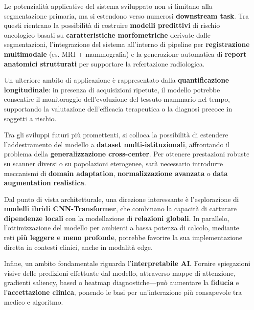 
Le potenzialità applicative del sistema sviluppato non si limitano alla segmentazione primaria, ma si estendono verso numerosi \textbf{downstream task}. Tra questi rientrano la possibilità di costruire \textbf{modelli predittivi} di rischio oncologico basati su \textbf{caratteristiche morfometriche} derivate dalle segmentazioni, l’integrazione del sistema all’interno di pipeline per \textbf{registrazione multimodale} (es. MRI + mammografia) e la generazione automatica di \textbf{report anatomici strutturati} per supportare la refertazione radiologica.

Un ulteriore ambito di applicazione è rappresentato dalla \textbf{quantificazione longitudinale}: in presenza di acquisizioni ripetute, il modello potrebbe consentire il monitoraggio dell’evoluzione del tessuto mammario nel tempo, supportando la valutazione dell’efficacia terapeutica o la diagnosi precoce in soggetti a rischio.


Tra gli sviluppi futuri più promettenti, si colloca la possibilità di estendere l’addestramento del modello a \textbf{dataset multi-istituzionali}, affrontando il problema della \textbf{generalizzazione cross-center}. Per ottenere prestazioni robuste su scanner diversi o su popolazioni eterogenee, sarà necessario introdurre meccanismi di \textbf{domain adaptation}, \textbf{normalizzazione avanzata} o \textbf{data augmentation realistica}.

Dal punto di vista architetturale, una direzione interessante è l’esplorazione di \textbf{modelli ibridi CNN-Transformer}, che combinano la capacità di catturare \textbf{dipendenze locali} con la modellazione di \textbf{relazioni globali}. In parallelo, l’ottimizzazione del modello per ambienti a bassa potenza di calcolo, mediante reti \textbf{più leggere e meno profonde}, potrebbe favorire la sua implementazione diretta in contesti clinici, anche in modalità edge.

Infine, un ambito fondamentale riguarda l’\textbf{interpretabile AI}. Fornire spiegazioni visive delle predizioni effettuate dal modello, attraverso mappe di attenzione, gradienti saliency, based o heatmap diagnostiche—può aumentare la \textbf{fiducia} e l’\textbf{accettazione clinica}, ponendo le basi per un’interazione più consapevole tra medico e algoritmo.



